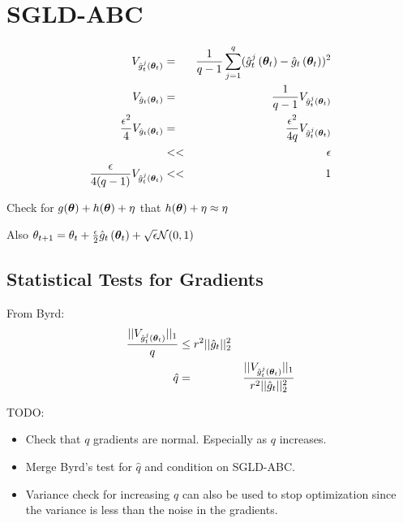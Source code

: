 \documentclass[]{article}
\begin{document}
\section{SGLD-ABC} \label{sgld}

\begin{eqnarray}
  V_{\gradestimaterepeat{t}{\thetav_t}{j}} & = & \frac{1}{q-1} \sum_{j=1}^q (\gradestimaterepeat{t}{\thetav_t}{j} - \gradestimate{t}{\thetav_t})^2 \\
  V_{\gradestimate{t}{\thetav_t}} & = & \frac{1}{q-1} V_{\gradestimaterepeat{t}{\thetav_t}{j}} \\
  \frac{\epsilon^2}{4 }V_{\gradestimate{t}{\thetav_t}} & = & \frac{\epsilon^2}{4 q }V_{\gradestimaterepeat{t}{\thetav_t}{j}} \\
                                                       & << & \epsilon \\
                    \frac{\epsilon}{4 (q-1) }V_{\gradestimaterepeat{t}{\thetav_t}{j}}  & << & 1                                  
\end{eqnarray}

Check for $g(\thetav) + h(\thetav) + \eta$ that $h(\thetav) + \eta \approx \eta$

Also $\theta_{t+1} = \theta_t + \frac{\epsilon}{2}\gradestimate{t}{\thetav_t} + \sqrt{\epsilon}\mathcal{N}(0,1)$

\subsection{Statistical Tests for Gradients}

From Byrd:
\begin{eqnarray}
\frac{||V_{\gradestimaterepeat{t}{\thetav_t}{j}} ||_1}{q} & \leq r^2 || \hat{g}_t ||_2^2 \\
\hat{q} & = & \frac{||V_{\gradestimaterepeat{t}{\thetav_t}{j}} ||_1}{r^2 || \hat{g}_t ||_2^2}
\end{eqnarray}

TODO:
\begin{itemize}
  \item Check that $q$ gradients are normal.  Especially as $q$ increases.
  \item Merge Byrd's test for $\hat{q}$ and condition on SGLD-ABC.
  \item Variance check for increasing $q$ can also be used to stop optimization since the variance is less than the noise in the gradients.
\end{itemize}
\end{document}
